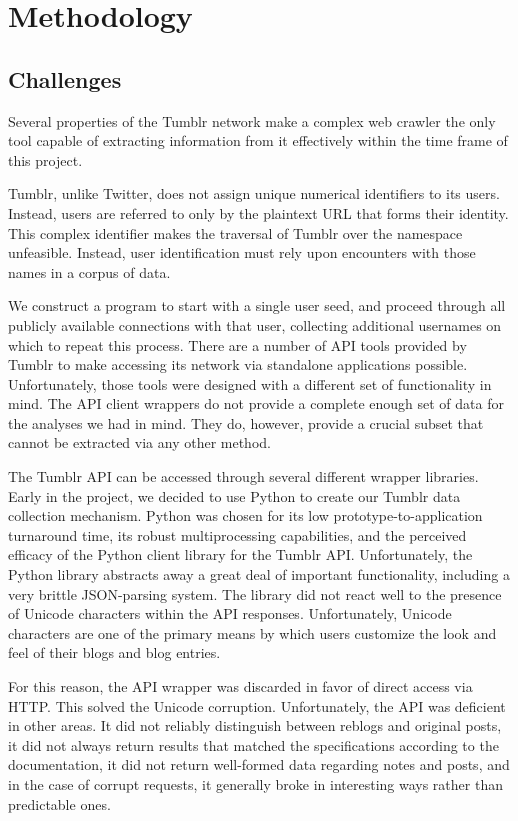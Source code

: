 \section{Methodology}
\label{sec:-method}

\subsection{Challenges}
Several properties of the Tumblr network make a complex web crawler the 
only tool capable of extracting information from it effectively within 
the time frame of this project.  

Tumblr, unlike Twitter, does not assign unique numerical identifiers 
to its users.  Instead, users are referred to only by the plaintext URL 
that forms their identity.  This complex identifier makes the traversal 
of Tumblr over the namespace unfeasible.  Instead, user identification 
must rely upon encounters with those names in a corpus of data.

We construct a program to start with a single user seed, and proceed 
through all publicly available connections with that user, collecting 
additional usernames on which to repeat this process.  There are a 
number of API tools provided by Tumblr to make accessing its network 
via standalone applications possible.  Unfortunately, those tools were 
designed with a different set of functionality in mind.  The API 
client wrappers do not provide a complete enough set of data for the 
analyses we had in mind.  They do, however, provide a crucial subset 
that cannot be extracted via any other method.

The Tumblr API can be accessed through several different wrapper 
libraries.  Early in the project, we decided to use Python to create 
our Tumblr data collection mechanism.  Python was chosen for its 
low prototype-to-application turnaround time, its robust 
multiprocessing capabilities, and the perceived efficacy of the 
Python client library for the Tumblr API.  Unfortunately, the Python 
library abstracts away a great deal of important functionality, 
including a very brittle JSON-parsing system.  The library did not 
react well to the presence of Unicode characters within the API 
responses.  Unfortunately, Unicode characters are one of the primary 
means by which users customize the look and feel of their blogs and 
blog entries.

For this reason, the API wrapper was discarded in favor of direct 
access via HTTP.  This solved the Unicode corruption.  Unfortunately, 
the API was deficient in other areas.  It did not reliably distinguish 
between reblogs and original posts, it did not always return results 
that matched the specifications according to the documentation, it did 
not return well-formed data regarding notes and posts, and in the case 
of corrupt requests, it generally broke in interesting ways rather 
than predictable ones.

